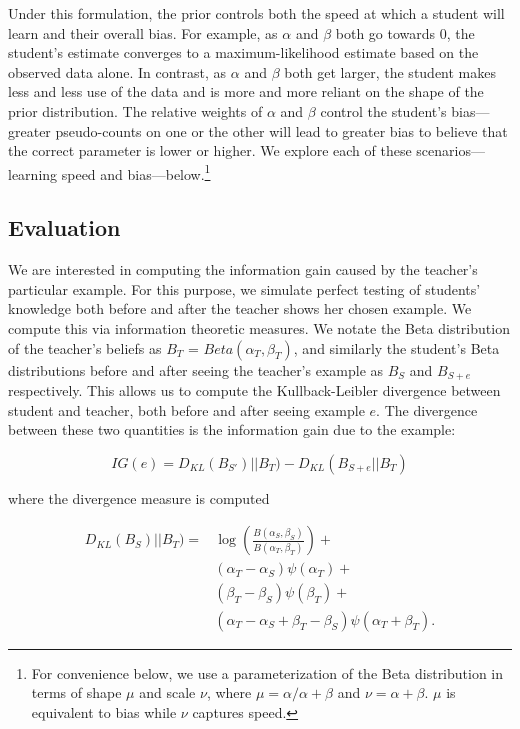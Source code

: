 \documentclass[10pt,letterpaper]{article}
\begin{document}
Under this formulation, the prior controls both the speed at which a student will learn and their overall bias. For example, as $\alpha$ and $\beta$ both go towards 0, the student's estimate converges to a maximum-likelihood estimate based on the observed data alone. In contrast, as $\alpha$ and $\beta$ both get larger, the student makes less and less use of the data and is more and more reliant on the shape of the prior distribution. The relative weights of $\alpha$ and $\beta$ control the student's bias---greater pseudo-counts on one or the other will lead to greater bias to believe that the correct parameter is lower or higher. We explore each of these scenarios---learning speed and bias---below.\footnote{For convenience below, we use a parameterization of the Beta distribution in terms of shape $\mu$ and scale $\nu$, where $\mu=\alpha / \alpha + \beta$ and $\nu = \alpha + \beta$. $\mu$ is equivalent to bias while $\nu$ captures speed.}

\subsection{Evaluation}

We are interested in computing the information gain caused by the teacher's particular example. For this purpose, we simulate perfect testing of students' knowledge both before and after the teacher shows her chosen example. We compute this via information theoretic measures. We notate the Beta distribution of the teacher's beliefs as $B_T$ = $Beta(\alpha_T,\beta_T)$, and similarly the student's Beta distributions before and after seeing the teacher's example as $B_{S}$ and $B_{S+e}$ respectively. This allows us to compute the Kullback-Leibler divergence \cite{cover2006} between student and teacher, both before and after seeing example $e$. The divergence between these two quantities is the information gain due to the example:

\begin{equation}
IG(e) = D_{KL} ( B_{S'})||B_T )  - D_{KL} ( B_{S+e} ||B_T ) 
\end{equation}

\noindent where the divergence measure is computed

\begin{equation}
\begin{split}
D_{KL} ( B_{S})||B_T )  = & \log( \frac{B(\alpha_{S},\beta_{S})}{B(\alpha_{T},\beta_{T})}) + \\
& (\alpha_T - \alpha_S) \psi (\alpha_T) + \\ 
& (\beta_T - \beta_S) \psi (\beta_T) + \\
& (\alpha_T - \alpha_S + \beta_T - \beta_S) \psi (\alpha_T + \beta_T).
\end{split}
\end{equation}
\end{document}
